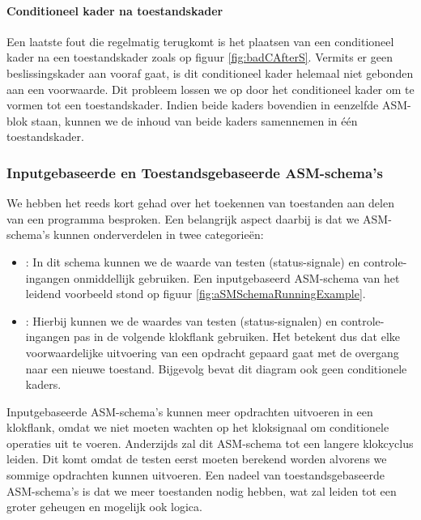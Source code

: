 \paragraph{Conditioneel kader na toestandskader}Een laatste fout die regelmatig terugkomt is het plaatsen van een conditioneel kader na een toestandskader zoals op figuur \ref{fig:badCAfterS}. Vermits er geen beslissingskader aan vooraf gaat, is dit conditioneel kader helemaal niet gebonden aan een voorwaarde. Dit probleem lossen we op door het conditioneel kader om te vormen tot een toestandskader. Indien beide kaders bovendien in eenzelfde ASM-blok staan, kunnen we de inhoud van beide kaders samennemen in \'e\'en toestandskader.
\subsubsection{Inputgebaseerde en Toestandsgebaseerde ASM-schema's}
We hebben het reeds kort gehad over het toekennen van toestanden aan delen van een programma besproken. Een belangrijk aspect daarbij is dat we ASM-schema's kunnen onderverdelen in twee categorie\"en:
\begin{itemize}
 \item {}: In dit schema kunnen we de waarde van testen (status-signale) en controle-ingangen onmiddellijk gebruiken. Een inputgebaseerd ASM-schema van het leidend voorbeeld stond op figuur \ref{fig:aSMSchemaRunningExample}.
 \item {}: Hierbij kunnen we de waardes van testen (status-signalen) en controle-ingangen pas in de volgende klokflank gebruiken. Het betekent dus dat elke voorwaardelijke uitvoering van een opdracht gepaard gaat met de overgang naar een nieuwe toestand. Bijgevolg bevat dit diagram ook geen conditionele kaders.
\end{itemize}
Inputgebaseerde ASM-schema's kunnen meer opdrachten uitvoeren in een klokflank, omdat we niet moeten wachten op het kloksignaal om conditionele operaties uit te voeren. Anderzijds zal dit ASM-schema tot een langere klokcyclus leiden. Dit komt omdat de testen eerst moeten berekend worden alvorens we sommige opdrachten kunnen uitvoeren. Een nadeel van toestandsgebaseerde ASM-schema's is dat we meer toestanden nodig hebben, wat zal leiden tot een groter geheugen en mogelijk ook logica.
